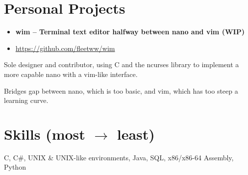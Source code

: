 \documentclass{article}
\newcommand{\ExpItem}[1]{\item #1}
\newcommand{\startexpitems}{
\begin{itemize}[leftmargin=.6cm]
}
\newcommand{\closeexpitems}{
\end{itemize}
}
\newcommand{\ProjectTitle}[1]{#1}
\newcommand{\ProjectShortDesc}[1]{#1}
\newcommand{\ProjectLink}[1]{\url{#1}}
\newcommand{\Project}[3]{
	\begin{itemize}[leftmargin=.125cm]
		\item[] {\textbf{\large #1 -- #2}} \item[] #3
	\end{itemize}
}
\begin{document}
\section*{Personal Projects}
\Project
	{\ProjectTitle{wim}}
	{\ProjectShortDesc{Terminal text editor halfway between nano and vim (WIP)}}
	{\ProjectLink{https://github.com/fleetww/wim}}
\startexpitems
	{\ExpItem{Sole designer and contributor, using C and the ncurses library to implement a more capable nano with a vim-like interface.}}
	{\ExpItem{Bridges gap between nano, which is too basic, and vim, which has too steep a learning curve.}}
\closeexpitems

\section*{Skills (most $\rightarrow$ least)}
C, C\#, UNIX \& UNIX-like environments, Java, SQL, x86/x86-64 Assembly, Python
\end{document}
